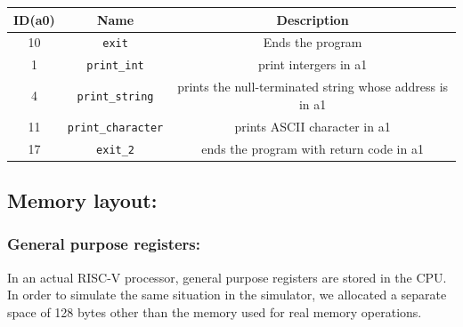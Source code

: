 \begin{tabular}{|c|c|c|}
\hline
     ID(a0)	& Name	& Description\\
     \hline
10&	\texttt{exit}&	Ends the program\\
1&	\texttt{print\_int}&	print intergers in a1\\
4&	\texttt{print\_string}&	prints the null-terminated string whose address is in a1\\
11&	\texttt{print\_character}&	prints ASCII character in a1\\
17&	\texttt{exit\_2}&	ends the program with return code in a1 \\
\hline
\end{tabular}

\subsection{Memory layout:}
\subsubsection{General purpose registers:}
In an actual RISC-V processor, general purpose registers are stored in the CPU. In order to simulate the same situation in the simulator, we allocated a separate space of 128 bytes other than the memory used for real memory operations.  
